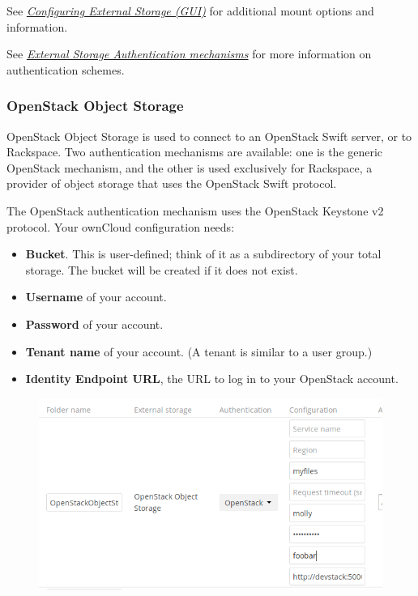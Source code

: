 \documentclass[letterpaper,10pt,english]{sphinxmanual}
\begin{document}
See {\hyperref[configuration_files/external_storage_configuration_gui::doc]{\emph{Configuring External Storage (GUI)}}} for additional mount
options and information.

See {\hyperref[configuration_files/external_storage/auth_mechanisms::doc]{\emph{External Storage Authentication mechanisms}}} for more information on authentication schemes.


\subsubsection{OpenStack Object Storage}
\label{configuration_files/external_storage/openstack:openstack-object-storage}\label{configuration_files/external_storage/openstack::doc}
OpenStack Object Storage is used to connect to an OpenStack Swift server, or to
Rackspace. Two authentication mechanisms are available: one is the generic
OpenStack mechanism, and the other is used exclusively for Rackspace, a provider
of object storage that uses the OpenStack Swift protocol.

The OpenStack authentication mechanism uses the OpenStack Keystone v2
protocol. Your ownCloud configuration needs:
\begin{itemize}
\item {} 
\textbf{Bucket}. This is user-defined; think of it as a subdirectory of your total
storage. The bucket will be created if it does not exist.

\item {} 
\textbf{Username} of your account.

\item {} 
\textbf{Password} of your account.

\item {} 
\textbf{Tenant name} of your account. (A tenant is similar to a user group.)

\item {} 
\textbf{Identity Endpoint URL}, the URL to log in to your OpenStack account.

\end{itemize}
\begin{figure}[htbp]
\centering

\includegraphics{openstack.png}
\end{figure}
\end{document}
